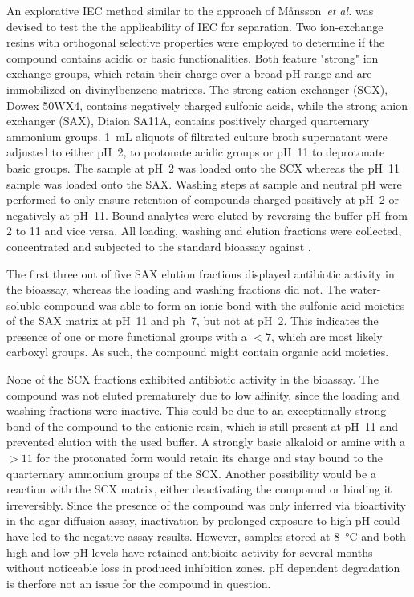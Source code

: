 An explorative IEC method similar to the approach of M{\aa}nsson~\textit{et al.} was devised to test the the applicability of IEC for separation.\autocite{Mansson2010}
Two ion-exchange resins with orthogonal selective properties were employed to determine if the compound contains acidic or basic functionalities.
Both feature "strong" ion exchange groups, which retain their charge over a broad pH-range and are immobilized on divinylbenzene matrices.
The strong cation exchanger (SCX), Dowex 50WX4, contains negatively charged sulfonic acids, while the strong anion exchanger (SAX), Diaion SA11A, contains positively charged quarternary ammonium groups.
\SI{1}{\milli\liter} aliquots of filtrated culture broth supernatant were adjusted to either pH~2, to protonate acidic groups or pH~11 to deprotonate basic groups.
The sample at pH~2 was loaded onto the SCX whereas the pH~11 sample was loaded onto the SAX.
Washing steps at sample and neutral pH were performed to only ensure retention of compounds charged positively at pH~2 or negatively at pH~11.
Bound analytes were eluted by reversing the buffer pH from 2 to 11 and vice versa.
All loading, washing and elution fractions were collected, concentrated and subjected to the standard bioassay against \coli{}.

The first three out of five SAX elution fractions displayed antibiotic activity in the bioassay, whereas the loading and washing fractions did not.
The water-soluble compound was able to form an ionic bond with the sulfonic acid moieties of the SAX matrix at pH~11 and ph~7, but not at pH~2.
This indicates the presence of one or more functional groups with a \pka$<7$, which are most likely carboxyl groups.
As such, the compound might contain organic acid moieties.

None of the SCX fractions exhibited antibiotic activity in the bioassay.
The compound was not eluted prematurely due to low affinity, since the loading and washing fractions were inactive.
This could be due to an exceptionally strong bond of the compound to the cationic resin, which is still present at pH~11 and prevented elution with the used buffer.
A strongly basic alkaloid or amine with a \pka{}$>11$ for the protonated form would retain its charge and stay bound to the quarternary ammonium groups of the SCX.
Another possibility would be a reaction with the SCX matrix, either deactivating the compound or binding it irreversibly.
Since the presence of the compound was only inferred via bioactivity in the agar-diffusion assay, inactivation by prolonged exposure to high pH could have led to the negative assay results.
However, samples stored at \SI{8}{\celsius} and both high and low pH levels have retained antibioitc activity for several months without noticeable loss in produced inhibition zones.
pH dependent degradation is therfore not an issue for the compound in question.

